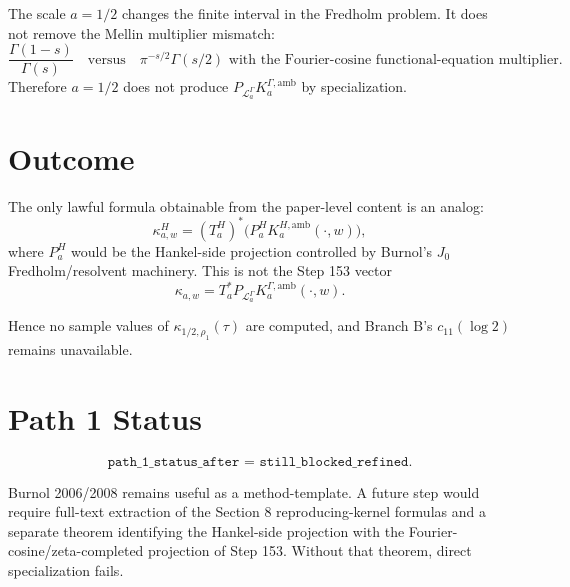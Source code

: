 \documentclass[11pt]{article}
\newcommand{\Kamb}{K_a^{\Gamma,\mathrm{amb}}}
\newcommand{\PL}{P_{\mathcal L_a^\Gamma}}
\newcommand{\kappaone}{\kappa_{1/2,\rho_1}}
\begin{document}
The scale \(a=1/2\) changes the finite interval in the Fredholm problem.  It does not remove the Mellin multiplier mismatch:
\[
\frac{\Gamma(1-s)}{\Gamma(s)}
\quad\text{versus}\quad
\pi^{-s/2}\Gamma(s/2)
\text{ with the Fourier-cosine functional-equation multiplier}.
\]
Therefore \(a=1/2\) does not produce \(\PL\Kamb\) by specialization.

\section*{Outcome}

The only lawful formula obtainable from the paper-level content is an analog:
\[
\kappa^{H}_{a,w}
=
(T^H_a)^*
\bigl(P^H_a K^{H,\mathrm{amb}}_a(\cdot,w)\bigr),
\]
where \(P^H_a\) would be the Hankel-side projection controlled by Burnol's \(J_0\) Fredholm/resolvent machinery.  This is not the Step 153 vector
\[
\kappa_{a,w}=T_a^*\PL\Kamb(\cdot,w).
\]

Hence no sample values of \(\kappaone(\tau)\) are computed, and Branch B's \(c_{11}(\log 2)\) remains unavailable.

\section*{Path 1 Status}

\[
\boxed{\texttt{path\_1\_status\_after = still\_blocked\_refined}}.
\]

Burnol 2006/2008 remains useful as a method-template.  A future step would require full-text extraction of the Section 8 reproducing-kernel formulas and a separate theorem identifying the Hankel-side projection with the Fourier-cosine/zeta-completed projection of Step 153.  Without that theorem, direct specialization fails.
\end{document}
